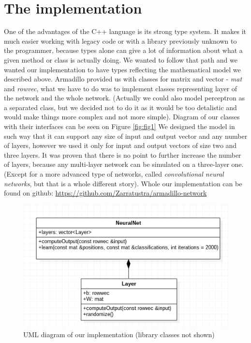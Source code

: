 \documentclass[3p,twocolumn]{elsarticle}
\begin{document}
\section{The implementation}

One of the advantages of the C++ language is its strong type system. It makes it much easier working with legacy code or with a library previously unknown to the programmer, because types alone can give a lot of information about what a given method or class is actually doing. We wanted to follow that path and we wanted our implementation to have types reflecting the mathematical model we described above. Armadillo provided us with classes for matrix and vector - \emph{mat} and \emph{rowvec}, what we have to do was to implement classes representing layer of the network and the whole network. (Actually we could also model perceptron as a separated class, but we decided not to do it as it would be too detalistic and would make things more complex and not more simple). Diagram of our classes with their interfaces can be seen on Figure \ref{fig:fig1} We designed the model in such way that it can support any size of input and output vector and any number of layers, however we used it only for input and output vectors of size two and three layers. It was proven that there is no point to further increase the number of layers, because any multi-layer network can be simulated on a three-layer one. (Except for a more advanced type of networks, called \emph{convolutional neural networks}, but that is a whole different story).
Whole our implementation can be found on github: \url{https://github.com/Zarratustra/armadillo-network}

\begin{figure}[h]
	
\label{fig:fig3}
  \includegraphics[width=\linewidth]{uml-diagram.png}
	\caption{UML diagram of our implementation (library classes not shown)}
	\label{fig3}
\end{figure}
\end{document}
